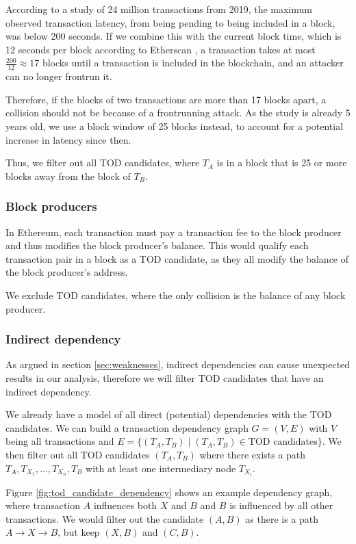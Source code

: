 \documentclass[draft,final]{vutinfth} %
\begin{document}
According to a study of 24 million transactions from 2019, the maximum observed transaction latency, from being pending to being included in a block, was below 200 seconds. If we combine this with the current block time, which is 12 seconds per block according to Etherscan \cite{etherscanio_ethereum_2024}, a transaction takes at most $\frac{200}{12} \approx 17$ blocks until a transaction is included in the blockchain, and an attacker can no longer frontrun it.

Therefore, if the blocks of two transactions are more than 17 blocks apart, a collision should not be because of a frontrunning attack. As the study is already 5 years old, we use a block window of 25 blocks instead, to account for a potential increase in latency since then.

Thus, we filter out all TOD candidates, where $T_A$ is in a block that is 25 or more blocks away from the block of $T_B$.

\subsubsection{Block producers}

In Ethereum, each transaction must pay a transaction fee to the block producer and thus modifies the block producer's balance. This would qualify each transaction pair in a block as a TOD candidate, as they all modify the balance of the block producer's address.

We exclude TOD candidates, where the only collision is the balance of any block producer.

\subsubsection{Indirect dependency}

As argued in section \ref{sec:weaknesses}, indirect dependencies can cause unexpected results in our analysis, therefore we will filter TOD candidates that have an indirect dependency.

We already have a model of all direct (potential) dependencies with the TOD candidates. We can build a transaction dependency graph $G = (V, E)$ with $V$ being all transactions and $E = \{ (T_A, T_B) \mid (T_A, T_B) \in \text{TOD candidates} \}$. We then filter out all TOD candidates $(T_A, T_B)$ where there exists a path $T_A, T_{X_1}, \dots, T_{X_n}, T_B$ with at least one intermediary node $T_{X_i}$.

Figure \ref{fig:tod_candidate_dependency} shows an example dependency graph, where transaction $A$ influences both $X$ and $B$ and $B$ is influenced by all other transactions. We would filter out the candidate $(A, B)$ as there is a path $A \rightarrow X \rightarrow B$, but keep $(X, B)$ and $(C, B)$.
\end{document}
